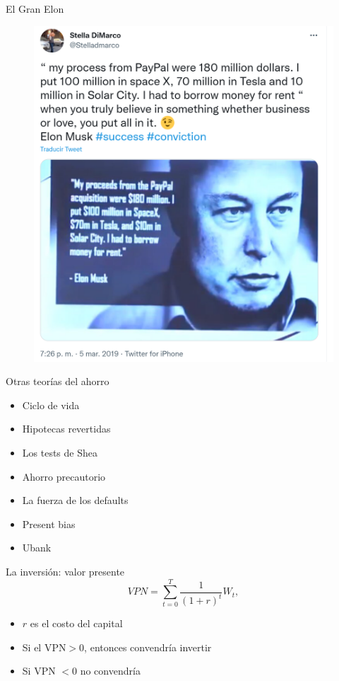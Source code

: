 \documentclass{beamer}
\begin{document}
\begin{frame}{El Gran Elon}
   \begin{figure} [H]
    \centering
    \href{https://twitter.com/Stelladmarco/status/1103059259586052097}{
    \includegraphics[scale=0.5]{Figures/C31.9.png}}
\end{figure} 
\end{frame} 


\begin{frame}{ Otras teorías del ahorro}
   \begin{itemize}
       \item Ciclo de vida
       \item Hipotecas revertidas
       \item Los tests de Shea
       \item Ahorro precautorio
       \item La fuerza de los defaults
       \item Present bias
       \item Ubank
   \end{itemize} 
\end{frame}


\begin{frame}{La inversión: valor presente}
    \begin{equation}
VPN = \sum_{t=0} ^{T} \frac{1}{(1+r)^t} W_t,
\end{equation}
\begin{itemize}
    \item $r$ es el costo del capital 
    \item Si el VPN$>0$, entonces convendría invertir
    \item Si VPN $<0$ no convendría
\end{itemize}
\end{frame}
\end{document}

